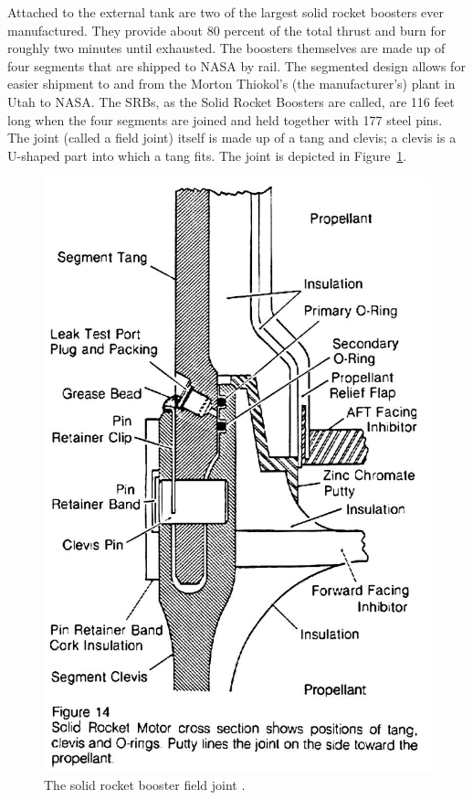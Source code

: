 Attached to the external tank are two of the largest solid
rocket boosters ever manufactured.
They provide about 80 percent of the total thrust and burn
for roughly two minutes until exhausted.
The boosters themselves are made up of four segments that
are shipped to NASA by rail.
The segmented design allows for easier shipment to and from
the Morton Thiokol's (the manufacturer's) plant in Utah to NASA.
The SRBs, as the Solid Rocket Boosters are called, are 116
feet long when the four segments are joined and held
together with 177 steel pins.
The joint (called a field joint) itself is made up of a tang
and clevis;  a clevis is a U-shaped part into which a tang
fits.
The joint is depicted in Figure~\ref{fieldj}.
\begin{figure}[p]
\includegraphics{RogersCommission-v1p57.jpg}
\caption{The solid rocket booster field joint
\protect\cite[vol. 1, p. 57]{rogers}.}
\label{fieldj}
\end{figure}

